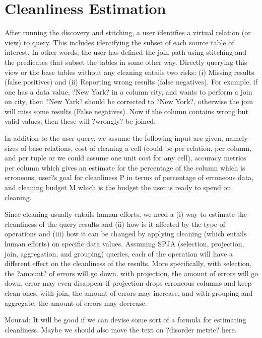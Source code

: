 \section{Cleanliness Estimation}
\label{sec:cleanliness}

After running the  discovery and stitching, a user identifies a virtual relation (or view) to query.  This includes identifying the subset of each source table of interest.  In other words, the user has defined the join path using stitching and the predicates that subset the tables in some other way.   Directly querying this view or the base tables without any cleaning entails two risks: (i) Missing results (false positives) and (ii) Reporting wrong results (false negatives). For example,  if one has a data value, ?New Yark? in a column city, and wants to perform a join on city, then ?New Yark? should be corrected to ?New York?, otherwise the join will miss some results (False negatives). Now if the column contains wrong but valid values, then these will ?wrongly? be joined. 

In addition to the user query, we assume the following input are given, namely sizes of base relations, cost of cleaning a cell (could be per relation, per column, and per tuple or we could assume one unit cost for any cell),  accuracy metrics per column which gives an estimate for the percentage of the column which is erroneous,  user?s goal for cleanliness P in terms of percentage of erroneous data,  and cleaning budget M which is the budget the user is ready to spend on cleaning.

Since cleaning usually entails human efforts, we need a (i) way to estimate the cleanliness of the query results and (ii) how is it affected by the type of operations and (iii) how it can be changed by applying cleaning (which entails human efforts) on specific data values. Assuming SPJA (selection, projection, join, aggregation, and grouping) queries, each of the operation will have a different effect on the cleanliness of the results. More specifically,  with selection, the ?amount? of errors will go down, with projection,  the amount of errors will go down, error may even disappear if projection drops erroneous columns and keep clean ones, with join, the amount of errors may increase, and with grouping and aggregate, the amount of errors may decrease. 

{Mourad: It will be good if we can devise some sort of a formula for estimating cleanliness. Maybe we should also move the text on ?disorder metric? here.}